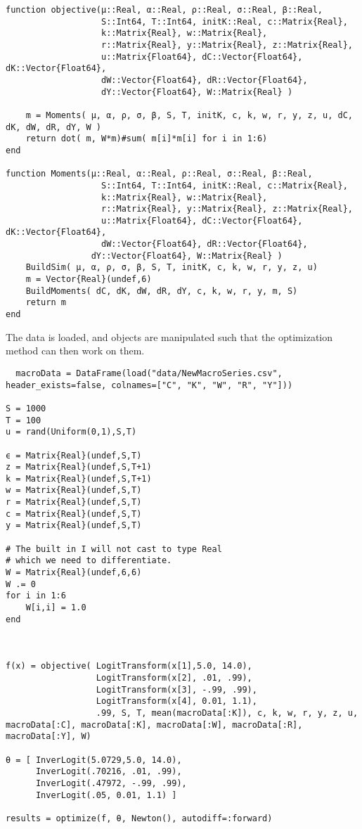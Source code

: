 \documentclass[12pt]{paper}
\begin{document}
\begin{verbatim}
function objective(μ::Real, α::Real, ρ::Real, σ::Real, β::Real,
                   S::Int64, T::Int64, initK::Real, c::Matrix{Real},
                   k::Matrix{Real}, w::Matrix{Real},
                   r::Matrix{Real}, y::Matrix{Real}, z::Matrix{Real},
                   u::Matrix{Float64}, dC::Vector{Float64}, dK::Vector{Float64},
                   dW::Vector{Float64}, dR::Vector{Float64},
                   dY::Vector{Float64}, W::Matrix{Real} )

    m = Moments( μ, α, ρ, σ, β, S, T, initK, c, k, w, r, y, z, u, dC, dK, dW, dR, dY, W )
    return dot( m, W*m)#sum( m[i]*m[i] for i in 1:6)
end

function Moments(μ::Real, α::Real, ρ::Real, σ::Real, β::Real,
                   S::Int64, T::Int64, initK::Real, c::Matrix{Real},
                   k::Matrix{Real}, w::Matrix{Real},
                   r::Matrix{Real}, y::Matrix{Real}, z::Matrix{Real},
                   u::Matrix{Float64}, dC::Vector{Float64}, dK::Vector{Float64},
                   dW::Vector{Float64}, dR::Vector{Float64},
                 dY::Vector{Float64}, W::Matrix{Real} )
    BuildSim( μ, α, ρ, σ, β, S, T, initK, c, k, w, r, y, z, u)
    m = Vector{Real}(undef,6)
    BuildMoments( dC, dK, dW, dR, dY, c, k, w, r, y, m, S)
    return m
end
\end{verbatim}

The data is loaded, and objects are manipulated such that the
optimization method can then work on them.

\begin{verbatim}
  macroData = DataFrame(load("data/NewMacroSeries.csv", header_exists=false, colnames=["C", "K", "W", "R", "Y"]))

S = 1000
T = 100
u = rand(Uniform(0,1),S,T)

ϵ = Matrix{Real}(undef,S,T)
z = Matrix{Real}(undef,S,T+1)
k = Matrix{Real}(undef,S,T+1)
w = Matrix{Real}(undef,S,T)
r = Matrix{Real}(undef,S,T)
c = Matrix{Real}(undef,S,T)
y = Matrix{Real}(undef,S,T)

# The built in I will not cast to type Real
# which we need to differentiate.
W = Matrix{Real}(undef,6,6)
W .= 0
for i in 1:6
    W[i,i] = 1.0
end



f(x) = objective( LogitTransform(x[1],5.0, 14.0),
                  LogitTransform(x[2], .01, .99),
                  LogitTransform(x[3], -.99, .99),
                  LogitTransform(x[4], 0.01, 1.1),
                  .99, S, T, mean(macroData[:K]), c, k, w, r, y, z, u, macroData[:C], macroData[:K], macroData[:W], macroData[:R], macroData[:Y], W)

θ = [ InverLogit(5.0729,5.0, 14.0),
      InverLogit(.70216, .01, .99),
      InverLogit(.47972, -.99, .99),
      InverLogit(.05, 0.01, 1.1) ]
      
results = optimize(f, θ, Newton(), autodiff=:forward)
\end{verbatim}
\end{document}
